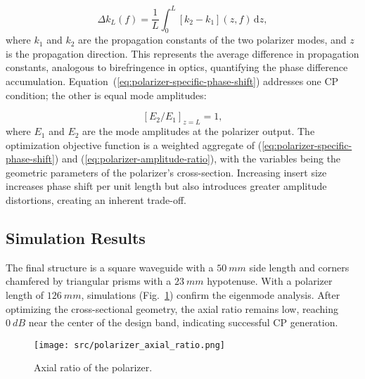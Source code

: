 \documentclass[conference,a4paper]{isap2025}
\begin{document}
\begin{equation}
    \label{eq:polarizer-specific-phase-shift}
    \Delta k_L(f) = \frac 1L \int_0^L \left[k_2-k_1\right](z,f)\,\mathrm d z,
\end{equation}
where $k_1$ and $k_2$ are the propagation constants of the two polarizer modes, and $z$ is the propagation direction.  This represents the average difference in propagation constants, analogous to birefringence in optics, quantifying the phase difference accumulation.  Equation~(\ref{eq:polarizer-specific-phase-shift}) addresses one CP condition; the other is equal mode amplitudes:

\begin{equation}
    \label{eq:polarizer-amplitude-ratio}
    \left[E_2/E_1\right]_{z=L} = 1,
\end{equation}
where $E_1$ and $E_2$ are the mode amplitudes at the polarizer output.  The optimization objective function is a weighted aggregate of (\ref{eq:polarizer-specific-phase-shift}) and (\ref{eq:polarizer-amplitude-ratio}), with the variables being the geometric parameters of the polarizer's cross-section.  Increasing insert size increases phase shift per unit length but also introduces greater amplitude distortions, creating an inherent trade-off.

\subsection{Simulation Results}
The final structure is a square waveguide with a $\qty{50}{mm}$ side length and corners chamfered by triangular prisms with a $\qty{23}{mm}$ hypotenuse.  With a polarizer length of $\qty{126}{mm}$, simulations (Fig.~\ref{fig:polarizer-axial-ratio}) confirm the eigenmode analysis.  After optimizing the cross-sectional geometry, the axial ratio remains low, reaching $\qty{0}{dB}$ near the center of the design band, indicating successful CP generation.

\begin{figure}[hbt]
    \centering
    \texttt{[image: src/polarizer\_axial\_ratio.png]}
    \caption{Axial ratio of the polarizer.}
    \label{fig:polarizer-axial-ratio}
\end{figure}

\end{document}
